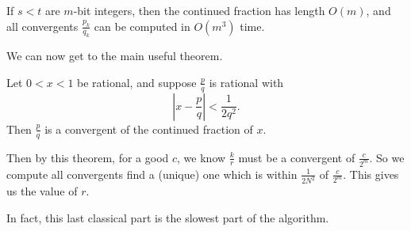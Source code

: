 \documentclass[a4paper]{article}
\begin{document}
\begin{thm}
  If $s < t$ are $m$-bit integers, then the continued fraction has length $O(m)$, and all convergents $\frac{p_k}{q_k}$ can be computed in $O(m^3)$ time.
\end{thm}

We can now get to the main useful theorem.
\begin{thm}
  Let $0 < x < 1$ be rational, and suppose $\frac{p}{q}$ is rational with
  \[
    \left|x - \frac{p}{q}\right| < \frac{1}{2q^2}.
  \]
  Then $\frac{p}{q}$ is a convergent of the continued fraction of $x$.
\end{thm}

Then by this theorem, for a good $c$, we know $\frac{k}{r}$ must be a convergent of $\frac{c}{2^m}$. So we compute all convergents find a (unique) one which is within $\frac{1}{2N^2}$ of $\frac{c}{2^m}$. This gives us the value of $r$.

In fact, this last classical part is the slowest part of the algorithm.
\end{document}
